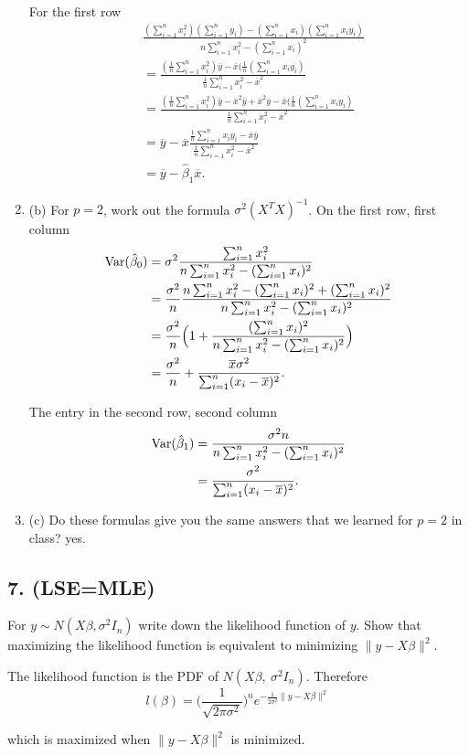 \documentclass{tufte-book}
\begin{document}
\begin{enumerate}
For the first row
\begin{align*}
&\frac{(\sum_{i=1}^nx_i^2)(\sum_{i=1}^ny_i) - (\sum_{i=1}^nx_i)(\sum_{i=1}^nx_iy_i)}{n\sum_{i=1}^n x_i^2 - (\sum_{i=1}^nx_i)^2}\\
&=\frac{(\frac{1}{n}\sum_{i=1}^nx_i^2)\overline{y}-\overline{x}(\frac{1}{n}(\sum_{i=1}^nx_iy_i)}{\frac{1}{n}\sum_{i=1}^nx_i^2-\overline{x}^2}\\
&=\frac{(\frac{1}{n}\sum_{i=1}^nx_i^2)\overline{y}-\overline{x}^2\overline{y}+\overline{x}^2\overline{y}-\overline{x}(\frac{1}{n}(\sum_{i=1}^nx_iy_i)}{\frac{1}{n}\sum_{i=1}^nx_i^2-\overline{x}^2}\\
&= \overline{y} - \overline{x}\frac{\frac{1}{n}\sum_{i=1}^n x_iy_i - \overline{x}\overline{y}}{\frac{1}{n}\sum_{i=1}^nx_i^2 - \overline{x}^2}\\
&= \overline{y}-\hat{\beta}_1\overline{x}.
\end{align*}
\item{(b)} For $p=2$, work out the formula $\sigma^2(X^TX)^{-1}$.
On the first row, first column
\begin{align*}
\operatorname{Var}(\hat{\beta}_0) &= \sigma^2\frac{\sum_{i=1}^nx_i^2}{n\sum_{i=1}^nx_i^2-(\sum_{i=1}^nx_i)^2}\\
&= \frac{\sigma^2}{n}\frac{n\sum_{i=1}^nx_i^2 -(\sum_{i=1}^nx_i)^2+(\sum_{i=1}^nx_i)^2}{n\sum_{i=1}^nx_i^2-(\sum_{i=1}^nx_i)^2}\\
&=\frac{\sigma^2}{n}\Big(1 + \frac{(\sum_{i=1}^nx_i)^2}{n\sum_{i=1}^nx_i^2-(\sum_{i=1}^nx_i)^2}\Big)\\
&=\frac{\sigma^2}{n} + \frac{\overline{x}\sigma^2}{\sum_{i=1}^n(x_i-\overline{x})^2}.
\end{align*}

The entry in the second row, second column
\begin{align*}
\operatorname{Var}(\hat{\beta}_1) &= \frac{\sigma^2n}{n\sum_{i=1}^nx_i^2 - (\sum_{i=1}^nx_i)^2}\\
&= \frac{\sigma^2}{\sum_{i=1}^n(x_i-\overline{x})^2}.
\end{align*}

\item{(c)} Do these formulas give you the same answers that we learned for $p=2$ in class?
yes.

\end{enumerate}

\subsection{7. (LSE=MLE)} For $y \sim N(X\beta, \sigma^2 I_n)$ write down the likelihood function of $y$.  Show that maximizing the likelihood function is equivalent to minimizing $\|y-X\beta\|^2$.

The likelihood function is the PDF of $N(X\beta,\ \sigma^2I_n)$.  Therefore
\[ l(\beta) = \Big(\frac{1}{\sqrt{2\pi\sigma^2}}\Big)^n e^{-\frac{1}{2\sigma^2}\|y-X\beta\|^2} \]

which is maximized when $\|y-X\beta\|^2$ is minimized.
\end{document}
